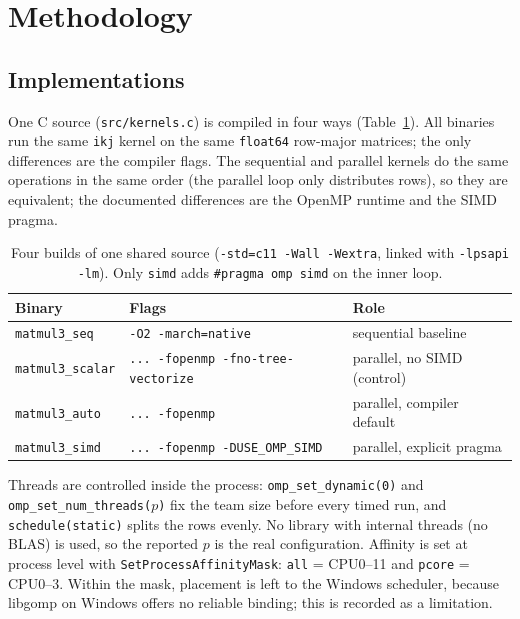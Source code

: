 \documentclass[11pt,a4paper]{article}
\begin{document}
\section{Methodology}

\subsection{Implementations}

One C source (\texttt{src/kernels.c}) is compiled in four ways
(Table~\ref{tab:builds}). All binaries run the same \texttt{ikj} kernel on
the same \texttt{float64} row-major matrices; the only differences are the
compiler flags. The sequential and parallel kernels do the same operations
in the same order (the parallel loop only distributes rows), so they are
equivalent; the documented differences are the OpenMP runtime and the SIMD
pragma.

\begin{table}[h!]
\centering
\small
\begin{tabular}{lll}
\toprule
Binary & Flags & Role \\
\midrule
\texttt{matmul3\_seq}    & \texttt{-O2 -march=native}                  & sequential baseline \\
\texttt{matmul3\_scalar} & \texttt{... -fopenmp -fno-tree-vectorize}   & parallel, no SIMD (control) \\
\texttt{matmul3\_auto}   & \texttt{... -fopenmp}                       & parallel, compiler default \\
\texttt{matmul3\_simd}   & \texttt{... -fopenmp -DUSE\_OMP\_SIMD}      & parallel, explicit pragma \\
\bottomrule
\end{tabular}
\caption{Four builds of one shared source (\texttt{-std=c11 -Wall
-Wextra}, linked with \texttt{-lpsapi -lm}). Only \texttt{simd} adds
\texttt{\#pragma omp simd} on the inner loop.}
\label{tab:builds}
\end{table}

{\sloppy
Threads are controlled inside the process: \texttt{omp\_set\_dynamic(0)}
and \texttt{omp\_set\_num\_threads($p$)} fix the team size before every
timed run, and \texttt{schedule(static)} splits the rows evenly. No library
with internal threads (no BLAS) is used, so the reported $p$ is the real
configuration. Affinity is set at process level with
\texttt{Set\-Process\-AffinityMask}: \texttt{all} = CPU0--11 and
\texttt{pcore} = CPU0--3. Within the mask, placement is left to the Windows
scheduler, because libgomp on Windows offers no reliable binding; this is
recorded as a limitation.\par}
\end{document}
